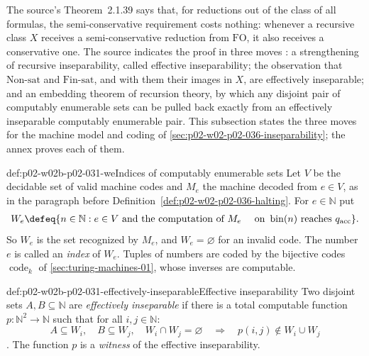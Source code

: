 The source's Theorem~2.1.39 says that, for reductions out of the class of
all formulas, the semi-conservative requirement costs nothing: whenever a
recursive class \(X\) receives a semi-conservative reduction from
\(\mathrm{FO}\), it also receives a conservative one.  The source indicates
the proof in three moves \cite[Sect.~2.1.2, pp.~37--38]{BorgerGradelGurevich1997}:
a strengthening of recursive inseparability, called effective
inseparability; the observation that \(\mathrm{Non\text{-}sat}\) and
\(\mathrm{Fin\text{-}sat}\), and with them their images in \(X\), are
effectively inseparable; and an embedding theorem of recursion theory, by
which any disjoint pair of computably enumerable sets can be pulled back
exactly from an effectively inseparable computably enumerable pair.  This
subsection states the three moves for the machine model and coding of
\cref{sec:p02-w02-p02-036-inseparability}; the annex proves each of them.

\begin{hbconvention}{def:p02-w02b-p02-031-we}{Indices of computably enumerable sets}
Let \(V\) be the decidable set of valid machine codes and \(M_e\) the machine
decoded from \(e\in V\), as in the paragraph before
Definition~\ref{def:p02-w02-p02-036-halting}.  For \(e\in\mathbb N\) put
\[
\begin{aligned}
 W_e\defeq\{n\in\mathbb N:{}& e\in V\text{ and the computation of }M_e\
   &\text{on }\operatorname{bin}(n)\text{ reaches }q_{\mathrm{acc}}\}.
\end{aligned}
\]
So \(W_e\) is the set recognized by \(M_e\), and \(W_e=\varnothing\) for an
invalid code.  The number \(e\) is called an \emph{index} of \(W_e\).
Tuples of numbers are coded by the bijective codes \(\operatorname{code}_k\)
of \cref{sec:turing-machines-01}, whose inverses are computable.
\index{index!of a computably enumerable set}
\end{hbconvention}

\begin{hbdefinition}{def:p02-w02b-p02-031-effectively-inseparable}{Effective inseparability}
Two disjoint sets \(A,B\subseteq\mathbb N\) are \emph{effectively
inseparable} if there is a total computable function
\(p:\mathbb N^{2}\to\mathbb N\) such that for all \(i,j\in\mathbb N\):
\[
 A\subseteq W_i,\quad B\subseteq W_j,\quad W_i\cap W_j=\varnothing
 \quad\Longrightarrow\quad p(i,j)\notin W_i\cup W_j
\]
\cite[Sect.~2.1.2, p.~37]{BorgerGradelGurevich1997}.  The function \(p\) is a
\emph{witness} of the effective inseparability.
\end{hbdefinition}

